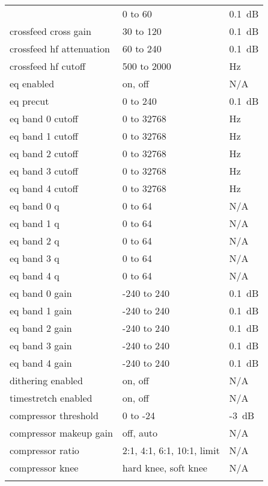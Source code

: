 \begin{center}
\begin{longtable}{>{\raggedright}p{}>{\raggedright}p{}p{}}
{      crossfeed direct gain
                    & 0 to 60           & 0.1~dB\\
      crossfeed cross gain
                    & 30 to 120         & 0.1~dB\\
      crossfeed hf attenuation
                    & 60 to 240         & 0.1~dB\\
      crossfeed hf cutoff
                    & 500 to 2000       & Hz\\
%
      eq enabled    & on, off           & N/A\\
      eq precut     & 0 to 240          & 0.1~dB\\
      eq band 0 cutoff & 0 to 32768     & Hz\\
      eq band 1 cutoff & 0 to 32768     & Hz\\
      eq band 2 cutoff & 0 to 32768     & Hz\\
      eq band 3 cutoff & 0 to 32768     & Hz\\
      eq band 4 cutoff & 0 to 32768     & Hz\\
      eq band 0 q   & 0 to 64           & N/A\\
      eq band 1 q   & 0 to 64           & N/A\\
      eq band 2 q   & 0 to 64           & N/A\\
      eq band 3 q   & 0 to 64           & N/A\\
      eq band 4 q   & 0 to 64           & N/A\\
      eq band 0 gain & -240 to 240      & 0.1~dB\\
      eq band 1 gain & -240 to 240      & 0.1~dB\\
      eq band 2 gain & -240 to 240      & 0.1~dB\\
      eq band 3 gain & -240 to 240      & 0.1~dB\\
      eq band 4 gain & -240 to 240      & 0.1~dB\\
%
      dithering enabled & on, off       & N/A\\
%
      timestretch enabled & on, off     & N/A\\
%
      compressor threshold      & 0 to -24      & -3~dB\\
      compressor makeup gain    & off, auto     & N/A\\
      compressor ratio          & 2:1, 4:1, 6:1, 10:1, limit
                                                & N/A\\
      compressor knee           & hard knee, soft knee
                                                & N/A\\
}
\end{longtable}
\end{center}
